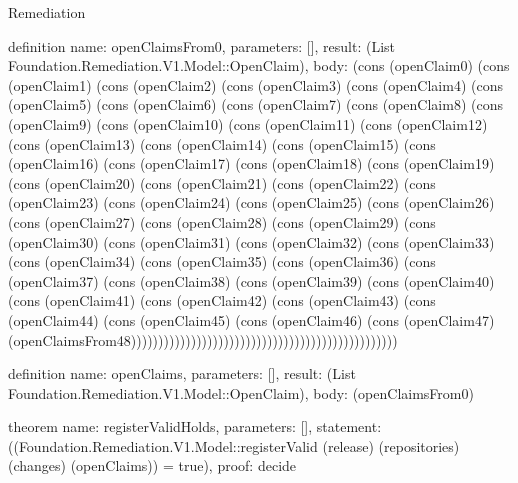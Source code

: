 \begin{lexlean}{Remediation}
\begin{semanticmodule}
definition{
  name: openClaimsFrom0,
  parameters: [],
  result: (List Foundation.Remediation.V1.Model::OpenClaim),
  body: (cons (openClaim0) (cons (openClaim1) (cons (openClaim2) (cons (openClaim3) (cons (openClaim4) (cons (openClaim5) (cons (openClaim6) (cons (openClaim7) (cons (openClaim8) (cons (openClaim9) (cons (openClaim10) (cons (openClaim11) (cons (openClaim12) (cons (openClaim13) (cons (openClaim14) (cons (openClaim15) (cons (openClaim16) (cons (openClaim17) (cons (openClaim18) (cons (openClaim19) (cons (openClaim20) (cons (openClaim21) (cons (openClaim22) (cons (openClaim23) (cons (openClaim24) (cons (openClaim25) (cons (openClaim26) (cons (openClaim27) (cons (openClaim28) (cons (openClaim29) (cons (openClaim30) (cons (openClaim31) (cons (openClaim32) (cons (openClaim33) (cons (openClaim34) (cons (openClaim35) (cons (openClaim36) (cons (openClaim37) (cons (openClaim38) (cons (openClaim39) (cons (openClaim40) (cons (openClaim41) (cons (openClaim42) (cons (openClaim43) (cons (openClaim44) (cons (openClaim45) (cons (openClaim46) (cons (openClaim47) (openClaimsFrom48)))))))))))))))))))))))))))))))))))))))))))))))))
}

definition{
  name: openClaims,
  parameters: [],
  result: (List Foundation.Remediation.V1.Model::OpenClaim),
  body: (openClaimsFrom0)
}

theorem{
  name: registerValidHolds,
  parameters: [],
  statement: ((Foundation.Remediation.V1.Model::registerValid (release) (repositories) (changes) (openClaims)) = true),
  proof: decide{}
}
\end{semanticmodule}
\end{lexlean}
